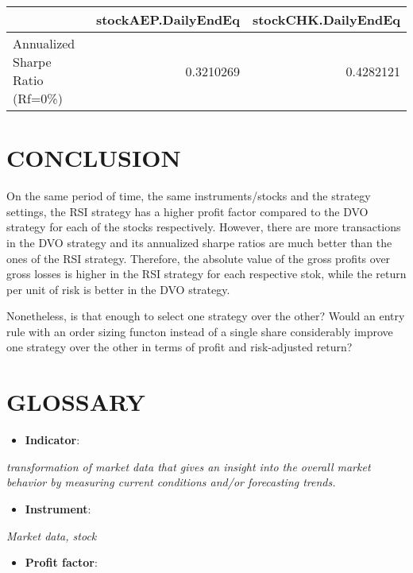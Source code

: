 \documentclass[12pt,]{article}
\providecommand{\tightlist}{%
  \setlength{\itemsep}{0pt}\setlength{\parskip}{0pt}}
\begin{document}
\begin{longtable}[]{@{}lrr@{}}
\toprule
& stockAEP.DailyEndEq & stockCHK.DailyEndEq\tabularnewline
\midrule
\endhead
Annualized Sharpe Ratio (Rf=0\%) & 0.3210269 & 0.4282121\tabularnewline
\bottomrule
\end{longtable}

\section{CONCLUSION}\label{conclusion}

On the same period of time, the same instruments/stocks and the strategy
settings, the RSI strategy has a higher profit factor compared to the
DVO strategy for each of the stocks respectively. However, there are
more transactions in the DVO strategy and its annualized sharpe ratios
are much better than the ones of the RSI strategy. Therefore, the
absolute value of the gross profits over gross losses is higher in the
RSI strategy for each respective stok, while the return per unit of risk
is better in the DVO strategy.

Nonetheless, is that enough to select one strategy over the other? Would
an entry rule with an order sizing functon instead of a single share
considerably improve one strategy over the other in terms of profit and
risk-adjusted return?

\pagebreak

\section{GLOSSARY}\label{glossary}

\begin{itemize}
\tightlist
\item
  \textbf{Indicator}:
\end{itemize}

\emph{transformation of market data that gives an insight into the
overall market behavior by measuring current conditions and/or
forecasting trends. }

\begin{itemize}
\tightlist
\item
  \textbf{Instrument}:
\end{itemize}

\emph{Market data, stock }

\begin{itemize}
\tightlist
\item
  \textbf{Profit factor}:
\end{itemize}
\end{document}
